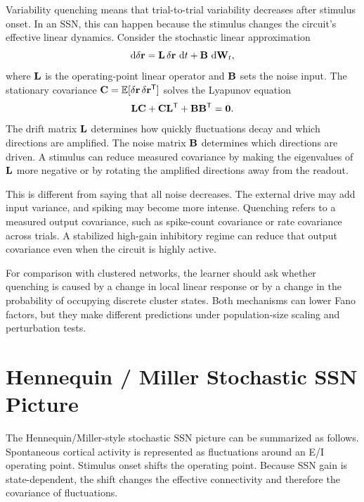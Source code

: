 Variability quenching means that trial-to-trial variability decreases after stimulus onset. In an SSN, this can happen because the stimulus changes the circuit's effective linear dynamics. Consider the stochastic linear approximation
%
\begin{equation}
  \mathop{}\!\mathrm{d}\delta\mathbf{r}
  =
  \mathbf{L}\,\delta\mathbf{r}\,\mathop{}\!\mathrm{d} t
  +
  \mathbf{B}\,\mathop{}\!\mathrm{d}\mathbf{W}_t,
  \label{eq:ssn-stochastic-linear-approx}
\end{equation}
%
where $\mathbf{L}$ is the operating-point linear operator and $\mathbf{B}$ sets the noise input. The stationary covariance $\mathbf{C}=\mathbb{E}[\delta\mathbf{r}\,\delta\mathbf{r}^{\mathsf T}]$ solves the Lyapunov equation
%
\begin{equation}
  \mathbf{L}\mathbf{C}+\mathbf{C}\mathbf{L}^{\mathsf T}
  +
  \mathbf{B}\mathbf{B}^{\mathsf T}
  =
  \mathbf{0}.
  \label{eq:ssn-lyapunov-covariance}
\end{equation}
%
The drift matrix $\mathbf{L}$ determines how quickly fluctuations decay and which directions are amplified. The noise matrix $\mathbf{B}$ determines which directions are driven. A stimulus can reduce measured covariance by making the eigenvalues of $\mathbf{L}$ more negative or by rotating the amplified directions away from the readout.

This is different from saying that all noise decreases. The external drive may add input variance, and spiking may become more intense. Quenching refers to a measured output covariance, such as spike-count covariance or rate covariance across trials. A stabilized high-gain inhibitory regime can reduce that output covariance even when the circuit is highly active.

For comparison with clustered networks, the learner should ask whether quenching is caused by a change in local linear response or by a change in the probability of occupying discrete cluster states. Both mechanisms can lower Fano factors, but they make different predictions under population-size scaling and perturbation tests.

\section{Hennequin / Miller Stochastic SSN Picture}
\label{sec:hennequin-miller-stochastic-ssn-picture}

The Hennequin/Miller-style stochastic SSN picture can be summarized as follows. Spontaneous cortical activity is represented as fluctuations around an E/I operating point. Stimulus onset shifts the operating point. Because SSN gain is state-dependent, the shift changes the effective connectivity and therefore the covariance of fluctuations.

